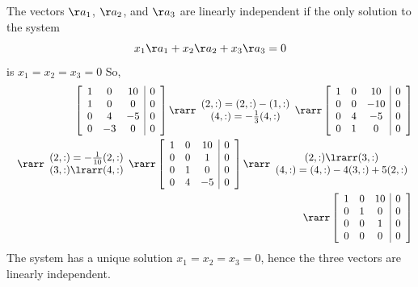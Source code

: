 \vspace{2mm}
The vectors $\aa_1$, $\aa_2$, and $\aa_3$ are linearly independent if the only solution to the system
$$
x_1\aa_1 + x_2\aa_2 + x_3\aa_3 = 0
$$
is $x_1=x_2=x_3=0$
So,
\begin{eqnarray*}
&&\left[\begin{array}{ccc|c}1&0&10&0\\1&0&0&0\\0&4&-5&0\\0&-3&0&0\end{array}\right]\rarr \begin{array}{c}(2,:)=(2,:)-(1,:)\\(4,:)=-\frac{1}{3}(4,:)\end{array}\rarr
\left[\begin{array}{ccc|c}1&0&10&0\\0&0&-10&0\\0&4&-5&0\\0&1&0&0\end{array}\right]\\&&\rarr
\begin{array}{c}(2,:)=-\frac{1}{10}(2,:)\\(3,:)\lrarr(4,:)\end{array}\rarr
\left[\begin{array}{ccc|c}1&0&10&0\\0&0&1&0\\0&1&0&0\\0&4&-5&0\end{array}\right]\rarr
\begin{array}{c}(2,:)\lrarr(3,:)\\(4,:)=(4,:)-4(3,:)+5(2,:)\end{array}\\&&\rarr
\left[\begin{array}{ccc|c}1&0&10&0\\0&1&0&0\\0&0&1&0\\0&0&0&0\end{array}\right]
\end{eqnarray*}
The system has a unique solution $x_1=x_2=x_3=0$, hence the three vectors are linearly independent.

